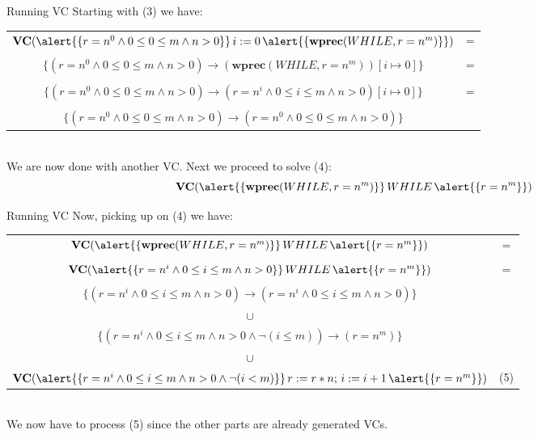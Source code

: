 \documentclass[aspectratio=169]{beamer}
\begin{document}
\begin{slide}{Running VC}
Starting with (3) we have:\\\vspace{0.5cm}
\small{
\begin{tabular}{cc}
  $\textbf{VC}(\alert{\{r = n^0 \land 0 \leq 0 \leq m \land n > 0\}}\,i := 0\,\alert{\{\textbf{wprec}(WHILE,r = n^m)\}})$ & =\\
  &\\
  $\{(r = n^0 \land 0 \leq 0 \leq m \land n > 0) \to (\textbf{wprec}(WHILE,r = n^m))[i \mapsto 0]\}$ & =\\
  &\\
  $\{(r = n^0 \land 0 \leq 0 \leq m \land n > 0) \to (r = n^i \land 0 \leq i \leq m \land n > 0)[i \mapsto 0]\}$ & =\\
  &\\
  $\{(r = n^0 \land 0 \leq 0 \leq m \land n > 0) \to (r = n^0 \land 0 \leq 0 \leq m \land n > 0)\}$
\end{tabular}}\\\vspace{0.3cm}
We are now done with another VC. Next we proceed to solve (4):
$$\textbf{VC}(\alert{\{\textbf{wprec}(WHILE,r = n^m)\}}\,WHILE\,\alert{\{r = n^m\}})$$
\end{slide}

\begin{slide}{Running VC}
Now, picking up on (4) we have:\\\vspace{0.5cm}
\small{
\begin{tabular}{cc}
  $\textbf{VC}(\alert{\{\textbf{wprec}(WHILE,r = n^m)\}}\,WHILE\,\alert{\{r = n^m\}})$ & =\\
  &\\
  $\textbf{VC}(\alert{\{r = n^i \land 0 \leq i \leq m \land n > 0\}}\,WHILE\,\alert{\{r = n^m\}})$ & =\\
  &\\
  $\{(r = n^i \land 0 \leq i \leq m \land n > 0) \to (r = n^i \land 0 \leq i \leq m \land n > 0)\}$ \\
  $\cup$ \\
  $\{(r = n^i \land 0 \leq i \leq m \land n > 0 \land \neg(i \leq m)) \to (r = n^m)\}$\\
  $\cup$\\
  $\textbf{VC}(\alert{\{r = n^i \land 0 \leq i \leq m \land n > 0 \land \neg(i < m)\}}\,r := r * n;\,i := i +1\,\alert{\{r = n^m\}})$ & (5)
\end{tabular}}\\\vspace{0.3cm}
We now have to process (5) since the other parts are already generated VCs.
\end{slide}
\end{document}
